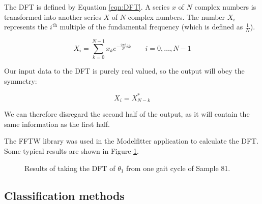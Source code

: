 The DFT is defined by Equation \ref{eqn:DFT}.
A series $x$ of $N$ complex numbers is transformed into another series $X$ of $N$ complex numbers.
The number $X_i$ represents the $i^\text{th}$ multiple of the fundamental frequency (which is defined as $\frac{1}{N}$).

\begin{equation}
	X_i = \sum_{k=0}^{N-1} x_k e^{-\frac{2 \pi i}{N} i k} \quad \quad i = 0, \dots, N-1
	\label{eqn:DFT}
\end{equation}

Our input data to the DFT is purely real valued, so the output will obey the symmetry:

\begin{equation}
	X_i = X_{N-k}^*
\end{equation}

We can therefore disregard the second half of the output, as it will contain the same information as the first half.

The FFTW library \cite{FFTW} was used in the Modelfitter application to calculate the DFT.
Some typical results are shown in Figure \ref{FFTResults}.

\begin{figure}[tb]
	\centering
	\quad
	\caption{Results of taking the DFT of $\theta_1$ from one gait cycle of Sample 81.}
	\label{FFTResults}
\end{figure}


\subsection{Classification methods}

